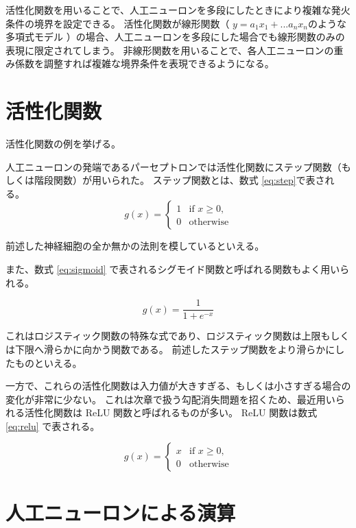 活性化関数を用いることで、人工ニューロンを多段にしたときにより複雑な発火条件の境界を設定できる。
活性化関数が線形関数（ $y=a_1 x_1 + ... a_n x_n $のような多項式モデル ）の場合、人工ニューロンを多段にした場合でも線形関数のみの表現に限定されてしまう。
非線形関数を用いることで、各人工ニューロンの重み係数を調整すれば複雑な境界条件を表現できるようになる。

\section{活性化関数}

活性化関数の例を挙げる。

人工ニューロンの発端であるパーセプトロンでは活性化関数にステップ関数（もしくは階段関数）が用いられた。
ステップ関数とは、数式 \ref{eq:step}で表される。
\begin{equation}
    \label{eq:step}
    g(x) = 
    \begin{cases}
        1 & \text{if $x \ge 0$,} \\
        0 & \text{otherwise}
    \end{cases}
\end{equation}

前述した神経細胞の全か無かの法則を模しているといえる。

また、数式 \ref{eq:sigmoid} で表されるシグモイド関数と呼ばれる関数もよく用いられる。

\begin{equation}
    \label{eq:sigmoid}
    g(x) = \frac{1}{1+e^{-x}}
\end{equation}

これはロジスティック関数の特殊な式であり、ロジスティック関数は上限もしくは下限へ滑らかに向かう関数である。
前述したステップ関数をより滑らかにしたものといえる。

一方で、これらの活性化関数は入力値が大きすぎる、もしくは小さすぎる場合の変化が非常に少ない。
これは次章で扱う勾配消失問題を招くため、最近用いられる活性化関数は ReLU 関数と呼ばれるものが多い。
ReLU 関数は数式 \ref{eq:relu} で表される。

\begin{equation}
    \label{eq:relu}
    g(x) = 
    \begin{cases}
        x & \text{if $x \ge 0$,} \\
        0 & \text{otherwise}
    \end{cases}
\end{equation}

\section{人工ニューロンによる演算}

